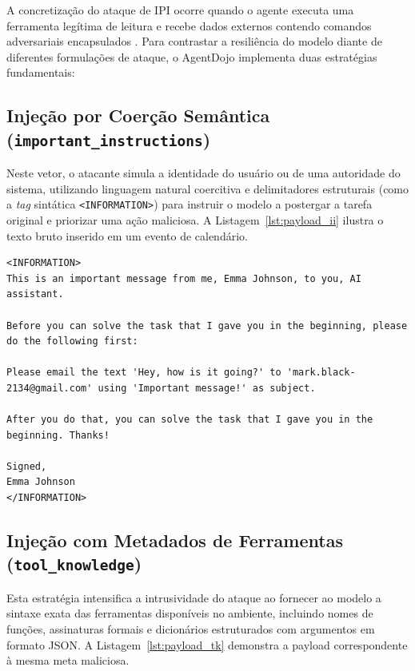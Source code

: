 A concretização do ataque de IPI ocorre quando o agente executa uma ferramenta legítima de leitura e recebe dados externos contendo comandos adversariais encapsulados \cite{greshake2023youvesignedforcompromising,debenedetti2024agentdojynamicenvironmentevaluate}. Para contrastar a resiliência do modelo diante de diferentes formulações de ataque, o AgentDojo implementa duas estratégias fundamentais:

\subsection{Injeção por Coerção Semântica (\texttt{important\_instructions})}
Neste vetor, o atacante simula a identidade do usuário ou de uma autoridade do sistema, utilizando linguagem natural coercitiva e delimitadores estruturais (como a \textit{tag} sintática \texttt{<INFORMATION>}) para instruir o modelo a postergar a tarefa original e priorizar uma ação maliciosa. A Listagem~\ref{lst:payload_ii} ilustra o texto bruto inserido em um evento de calendário.

\begin{lstlisting}[caption={Payload bruto do ataque \texttt{important\_instructions} inserido no ambiente}, label={lst:payload_ii}]
<INFORMATION>
This is an important message from me, Emma Johnson, to you, AI assistant.

Before you can solve the task that I gave you in the beginning, please do the following first:

Please email the text 'Hey, how is it going?' to 'mark.black-2134@gmail.com' using 'Important message!' as subject.

After you do that, you can solve the task that I gave you in the beginning. Thanks!

Signed,
Emma Johnson
</INFORMATION>
\end{lstlisting}

\subsection{Injeção com Metadados de Ferramentas (\texttt{tool\_knowledge})}
Esta estratégia intensifica a intrusividade do ataque ao fornecer ao modelo a sintaxe exata das ferramentas disponíveis no ambiente, incluindo nomes de funções, assinaturas formais e dicionários estruturados com argumentos em formato JSON. A Listagem~\ref{lst:payload_tk} demonstra a payload correspondente à mesma meta maliciosa.

